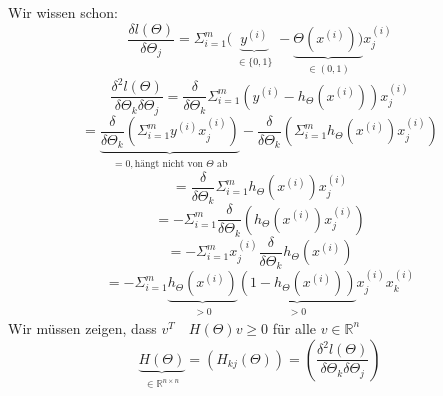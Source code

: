 \begin{enumerate}[(1)]
Wir wissen schon: 
\[ \frac{\delta l(\Theta)}{\delta \Theta_j} = \Sigma^m_{i=1}(\underbrace{y^{(i)}}_{\substack{\in \{0,1\}}} - \underbrace{\Theta(x^{(i)}))}_{\substack{\in (0,1)}} x^{(i)}_j\]
\[ \frac{\delta^2 l(\Theta)}{\delta \Theta_k \delta \Theta_j} = \frac{\delta}{\delta \Theta_k }\Sigma^m_{i=1} (y^{(i)} - h_\Theta(x^{(i)})) x_j^{(i)}\]
\[ =\underbrace{\frac{\delta}{\delta \Theta_k} (\Sigma_{i=1}^m y^{(i)} x_j^{(i)})}_{\substack{= 0, \text{hängt nicht von $\Theta$ ab}}} - \frac{\delta}{\delta \Theta_k} (\Sigma^m_{i=1} h_\Theta(x^{(i)}) x_j^{(i)})\]
\[ = \frac{\delta}{\delta \Theta_k} \Sigma^m_{i=1} h_\Theta (x^{(i)}) x_j^{(i)}\]
\[ = - \Sigma^m_{i=1} \frac{\delta}{\delta \Theta_k} (h_\Theta(x^{(i)}) x_j^{(i)})\]
\[ = - \Sigma^m_{i=1} x_j^{(i)} \frac{\delta}{\delta\Theta_k} h_\Theta(x^{(i)})\]
\[ = - \Sigma^m_{i=1} \underbrace{h_\Theta(x^{(i)})}_{\substack{> 0}} \underbrace{(1- h_\Theta(x^{(i)}))}_{\substack{> 0}} x_j^{(i)} x_k^{(i)}\]
Wir müssen zeigen, dass $v^T \quad H(\Theta)v \geq 0$ für alle $v \in \mathbb{R}^n$
\[ \underbrace{H(\Theta)}_{\substack{\in \mathbb{R}^{n \times n}}} = (H_{kj}(\Theta)) = \left( \frac{\delta^2 l(\Theta)}{\delta\Theta_k \delta\Theta_j}\right)\]


\end{enumerate}
